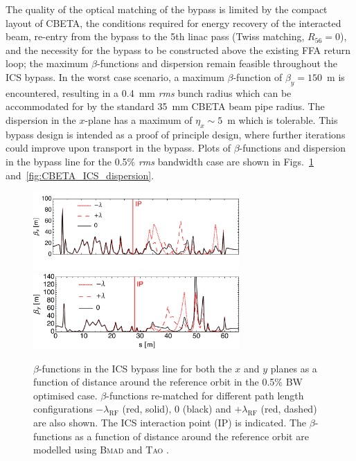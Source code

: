 \documentclass[../main.tex]{subfiles}
\begin{document}
The quality of the optical matching of the bypass is limited by the compact layout of CBETA, the conditions required for energy recovery of the interacted beam, re-entry from the bypass to the 5th linac pass (Twiss matching, $R_{56} =0$), and the necessity for the bypass to be constructed above the existing FFA return loop; the maximum $\beta$-functions and dispersion remain feasible throughout the ICS bypass. In the worst case scenario, a maximum $\beta$-function of $\beta_{y} = 150$~\si{\meter} is encountered, resulting in a 0.4~\si{\milli\meter} \textit{rms} bunch radius which can be accommodated for by the standard 35~\si{\milli\meter} CBETA beam pipe radius. The dispersion in the $x$-plane has a maximum of $\eta_{x}\sim5$~\si{\meter} which is tolerable. This bypass design is intended as a proof of principle design, where further iterations could improve upon transport in the bypass. Plots of $\beta$-functions and dispersion in the bypass line for the 0.5\% \textit{rms} bandwidth case are shown in Figs.~\ref{fig:CBETA_ICS_Twiss} and~\ref{fig:CBETA_ICS_dispersion}. 
\begin{figure}[!h]
\centering
\includegraphics[width=0.7\textwidth]{Figures/CBETA_Inverse_Compton_Source_Design/twissplotx.pdf}
\includegraphics[width=0.7\textwidth]{Figures/CBETA_Inverse_Compton_Source_Design/twissploty.pdf}
\caption{$\beta$-functions in the ICS bypass line for both the $x$ and $y$ planes as a function of distance around the reference orbit in the 0.5\% BW optimised case. $\beta$-functions re-matched for different path length configurations $-\lambda_{\mathrm{RF}}$ (red, solid), $0$ (black) and $+\lambda_{\mathrm{RF}}$ (red, dashed) are also shown. The ICS interaction point (IP) is indicated. The $\beta$-functions as a function of distance around the reference orbit are modelled using \textsc{Bmad} \cite{BmadManual} and \textsc{Tao} \cite{TaoManual}.}
\label{fig:CBETA_ICS_Twiss}
\end{figure}
\end{document}
